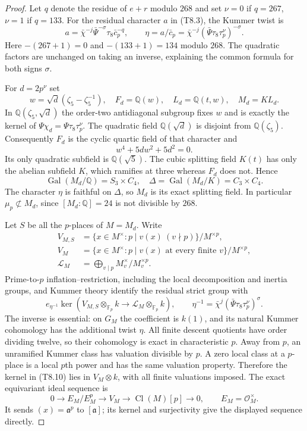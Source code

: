\begin{proof}
Let $q$ denote the residue of $e+r$ modulo $268$ and set
$\nu=0$ if $q=267$, $\nu=1$ if $q=133$.
For the residual character $a$ in (T8.3), the Kummer twist is
\[
 a=\bar\chi^{-j}\bar\Psi^{-\sigma}\tau_8\bar c_p^{-q},
 \qquad \eta=a/\bar c_p
       =\bar\chi^{-j}(\bar\Psi\tau_8\tau_p^\nu)^{-\sigma}.
 \tag{T8.5}
\]
Here $-(267+1)=0$ and $-(133+1)=134$ modulo $268$.
The quadratic factors are unchanged on taking an inverse, explaining
the common formula for both signs $\sigma$.

For $d=2p^\nu$ set
\[
 w=\sqrt d(\zeta_5-\zeta_5^{-1}),\quad F_d=\mathbb Q(w),
 \quad L_d=\mathbb Q(t,w),\quad M_d=KL_d.
 \tag{T8.6}
\]
In $\mathbb Q(\zeta_5,\sqrt d)$ the order-two antidiagonal
subgroup fixes $w$ and is exactly the kernel of
$\Psi\chi_d=\Psi\tau_8\tau_p^\nu$.  The quadratic field
$\mathbb Q(\sqrt d)$ is disjoint from $\mathbb Q(\zeta_5)$.
Consequently $F_d$ is the cyclic quartic field of that character and
\[
               w^4+5dw^2+5d^2=0.
 \tag{T8.7}
\]
Its only quadratic subfield is $\mathbb Q(\sqrt5)$.
The cubic splitting field $K(t)$ has only the abelian subfield $K$,
which ramifies at three whereas $F_d$ does not.  Hence
\[
 \operatorname{Gal}(M_d/\mathbb Q)=S_3\times C_4,
 \quad \Delta=\operatorname{Gal}(M_d/K)=C_3\times C_4.
 \tag{T8.8}
\]
The character $\eta$ is faithful on $\Delta$, so $M_d$ is its exact
splitting field.  In particular $\mu_p\not\subset M_d$, since
$[M_d:\mathbb Q]=24$ is not divisible by $268$.

Let $S$ be all the $p$-places of $M=M_d$.  Write
\[
 \begin{split}
 V_{M,S}&=\{x\in M^\times:p\mid v(x)\ (v\nmid p)\}/M^{\times p},\\
 V_M&=\{x\in M^\times:p\mid v(x)\text{ at every finite }v\}/M^{\times p},\\
 \mathcal L_M&=\bigoplus_{v\mid p}M_v^\times/M_v^{\times p}.
 \end{split}\tag{T8.9}
\]
Prime-to-$p$ inflation--restriction, including the local decomposition
and inertia groups, and Kummer theory identify the residual strict
group with
\[
 e_{\eta^{-1}}\ker\left(V_{M,S}\otimes_{\mathbb F_p}k
                 \longrightarrow\mathcal L_M\otimes_{\mathbb F_p}k\right),
 \qquad \eta^{-1}=\bar\chi^j(\bar\Psi\tau_8\tau_p^\nu)^\sigma.
 \tag{T8.10}
\]
The inverse is essential: on $G_M$ the coefficient is $k(1)$, and
its natural Kummer cohomology has the additional twist $\eta$.
All finite descent quotients have order dividing twelve, so their
cohomology is exact in characteristic $p$.
Away from $p$, an unramified Kummer class has valuation divisible
by $p$.  A zero local class at a $p$-place is a local $p$th power
and has the same valuation property.  Therefore the kernel in
(T8.10) lies in $V_M\otimes k$, with all finite valuations imposed.
The exact equivariant ideal sequence is
\[
 0\longrightarrow E_M/E_M^p\longrightarrow V_M
         \longrightarrow\operatorname{Cl}(M)[p]\longrightarrow0,
 \qquad E_M=\mathcal O_M^\times.
 \tag{T8.11}
\]
It sends $(x)=\mathfrak a^p$ to $[\mathfrak a]$; its kernel and
surjectivity give the displayed sequence directly.


\end{proof}
